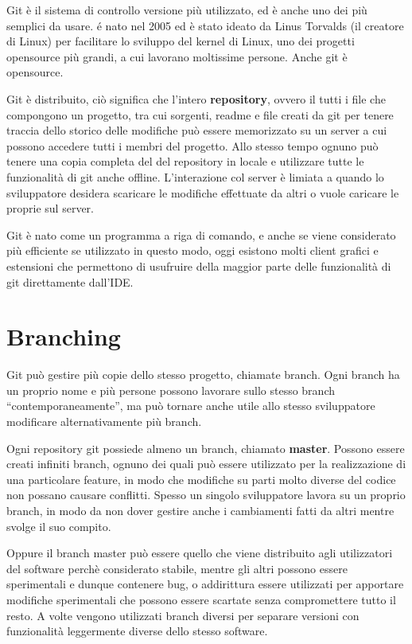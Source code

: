 \documentclass{article}
\begin{document}
Git è il sistema di controllo versione più utilizzato, ed è anche uno dei più
semplici da usare. é nato nel 2005 ed è stato ideato da Linus Torvalds (il
creatore di Linux) per facilitare lo sviluppo del kernel di Linux, uno dei
progetti opensource più grandi, a cui lavorano moltissime persone. Anche git è
opensource.

Git è distribuito, ciò significa che l'intero \textbf{repository}, ovvero il
tutti i file che compongono un progetto, tra cui sorgenti, readme e file creati
da git per tenere traccia dello storico delle modifiche può essere memorizzato
su un server a cui possono accedere tutti i membri del progetto. Allo stesso
tempo ognuno può tenere una copia completa del del repository in locale e
utilizzare tutte le funzionalità di git anche offline. L'interazione col server
è limiata a quando lo sviluppatore desidera scaricare le modifiche effettuate da
altri o vuole caricare le proprie sul server.

Git è nato come un programma a riga di comando, e anche se viene considerato più
efficiente se utilizzato in questo modo, oggi esistono molti client grafici e
estensioni che permettono di usufruire della maggior parte delle funzionalità di
git direttamente dall'IDE.

\section{Branching}

Git può gestire più copie dello stesso progetto, chiamate branch. Ogni branch ha
un proprio nome e più persone possono lavorare sullo stesso branch
``contemporaneamente'', ma può tornare anche utile allo stesso sviluppatore
modificare alternativamente più branch.

Ogni repository git possiede almeno un branch, chiamato \textbf{master}.
Possono essere creati infiniti branch, ognuno dei quali può essere utilizzato
per la realizzazione di una particolare feature, in modo che modifiche su parti
molto diverse del codice non possano causare conflitti. Spesso un singolo
sviluppatore lavora su un proprio branch, in modo da non dover gestire anche i
cambiamenti fatti da altri mentre svolge il suo compito. 

Oppure il branch master può essere quello che viene distribuito agli
utilizzatori del software perchè considerato stabile, mentre gli altri possono
essere sperimentali e dunque contenere bug, o addirittura essere utilizzati per
apportare modifiche sperimentali che possono essere scartate senza compromettere
tutto il resto. A volte vengono utilizzati branch diversi per separare versioni
con funzionalità leggermente diverse dello stesso software.
\end{document}
